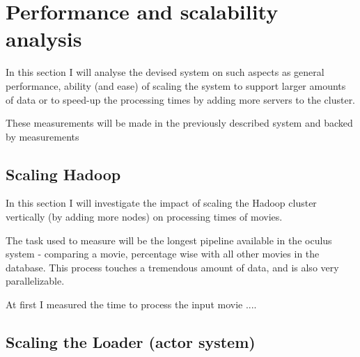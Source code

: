 \chapter{Performance and scalability analysis}
In this section I will analyse the devised system on such aspects as general performance, ability (and ease) of scaling the system
to support larger amounts of data or to speed-up the processing times by adding more servers to the cluster.

These measurements will be made in the previously described system and backed by measurements 

\section{Scaling Hadoop}
In this section I will investigate the impact of scaling the Hadoop cluster vertically (by adding more nodes) on processing times of movies.

The task used to measure will be the longest pipeline available in the oculus system - comparing a movie, percentage wise with all other movies in the database.
This process touches a tremendous amount of data, and is also very parallelizable.

At first I measured the time to process the input movie ....

\section{Scaling the Loader (actor system)}
